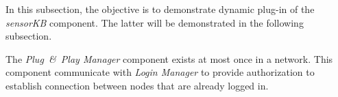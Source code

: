 In this subsection, the objective is to demonstrate dynamic plug-in of the \emph{sensorKB} component. 
The latter will be demonstrated in the following subsection. 



The \emph{Plug~\&~Play Manager} component exists at most once in a \xme network.
This component communicate with \emph{Login Manager} to provide authorization to establish connection between nodes that are already logged in.

